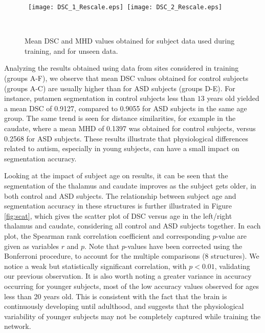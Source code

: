 \documentclass[twoside,fleqn,espcrc2]{elsarticle}
\begin{document}
\begin{figure}[h!]
     \begin{center}
     \mbox{
        \texttt{[image: DSC\_1\_Rescale.eps]}
        \texttt{[image: DSC\_2\_Rescale.eps]}
     }
     
     \vspace{1mm}
     
     \mbox{
        }
        \caption{Mean DSC and MHD values obtained for subject data used during training, and for unseen data.}
        \label{fig:dsc1}
\end{center}        
\end{figure}

Analyzing the results obtained using data from sites considered in training (groups A-F), we observe that mean DSC values obtained for control subjects (groups A-C) are usually higher than for ASD subjects (groups D-E). For instance, putamen segmentation in control subjects less than $13$ years old yielded a mean DSC of 0.9127, compared to 0.9055 for ASD subjects in the same age group. The same trend is seen for distance similarities, for example in the caudate, where a mean MHD of 0.1397 was obtained for control subjects, versus 0.2568 for ASD subjects. These results illustrate that physiological differences related to autism, especially in young subjects, can have a small impact on segmentation accuracy.

Looking at the impact of subject age on results, it can be seen that the segmentation of the thalamus and caudate improves as the subject gets older, in both control and ASD subjects. The relationship between subject age and segmentation accuracy in these structures is further illustrated in Figure \ref{fig:scat}, which gives the scatter plot of DSC versus age in the left/right thalamus and caudate, considering all control and ASD subjects together. In each plot, the Spearman rank correlation coefficient and corresponding $p$-value are given as variables $r$ and $p$. Note that $p$-values have been corrected using the Bonferroni procedure, to account for the multiple comparisons (8 structures). We notice a weak but statistically significant correlation, with $p < 0.01$, validating our previous observation. It is also worth noting a greater variance in accuracy occurring for younger subjects, most of the low accuracy values observed for ages less than 20 years old. This is consistent with the fact that the brain is continuously developing until adulthood, and suggests that the physiological variability of younger subjects may not be completely captured while training the network.
\end{document}

